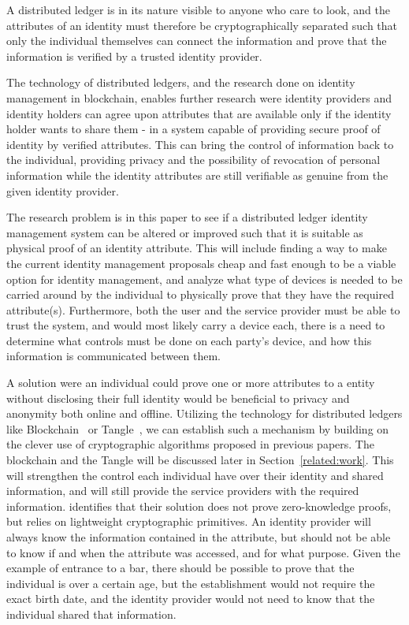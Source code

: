 A distributed ledger is in its nature visible to anyone who care to look, and the attributes of an identity must therefore be cryptographically separated such that only the individual themselves can connect the information and prove that the information is verified by a trusted identity provider. 

The technology of distributed ledgers, and the research done on identity management in blockchain, enables further research were identity providers and identity holders can agree upon attributes that are available only if the identity holder wants to share them - in a system capable of providing secure proof of identity by verified attributes. This can bring the control of information back to the individual, providing privacy and the possibility of revocation of personal information while the identity attributes are still verifiable as genuine from the given identity provider.

The research problem is in this paper to see if a distributed ledger identity management system can be altered or improved such that it is suitable as physical proof of an identity attribute. This will include finding a way to make the current identity management proposals cheap and fast enough to be a viable option for identity management, and analyze what type of devices is needed to be carried around by the individual to physically prove that they have the required attribute(s). Furthermore, both the user and the service provider must be able to trust the system, and would most likely carry a device each, there is a need to determine what controls must be done on each party's device, and how this information is communicated between them.

A solution were an individual could prove one or more attributes to a entity without disclosing their full identity would be beneficial to privacy and anonymity both online and offline. Utilizing the technology for distributed ledgers like Blockchain~\cite{bitcoin2008} or Tangle~\cite{IOTA_Whitepaper}, we can establish such a mechanism by building on the clever use of cryptographic algorithms proposed in previous papers. The blockchain and the Tangle will be discussed later in Section~\ref{related:work}. This will strengthen the control each individual have over their identity and shared information, and will still provide the service providers with the required information. \cite{Azouvi2017} identifies that their solution does not prove zero-knowledge proofs, but relies on lightweight cryptographic primitives. An identity provider will always know the information contained in the attribute, but should not be able to know if and when the attribute was accessed, and for what purpose. Given the example of entrance to a bar, there should be possible to prove that the individual is over a certain age, but the establishment would not require the exact birth date, and the identity provider would not need to know that the individual shared that information.

